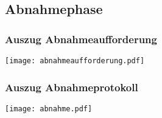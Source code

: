 \subsection{Abnahmephase}
\label{app:Abnahme}

\subsubsection*{Auszug Abnahmeaufforderung}

\begin{center}
	\texttt{[image: abnahmeaufforderung.pdf]}
\end{center}

\subsubsection*{Auszug Abnahmeprotokoll}

\begin{center}
	\texttt{[image: abnahme.pdf]}
\end{center}
 